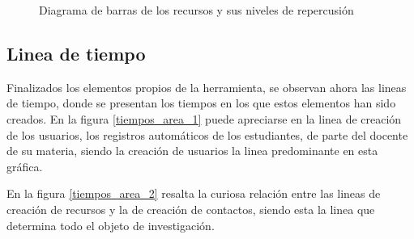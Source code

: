 \begin{figure}
\centering

\caption{Diagrama de barras de los recursos y sus niveles de repercusión}
\label{recursos_bars_1}
\end{figure}

%

\subsection{Linea de tiempo}
Finalizados los elementos propios de la herramienta, se observan ahora las
lineas de tiempo, donde se presentan los tiempos en los que estos elementos han
sido creados.
En la figura \ref{tiempos_area_1} puede apreciarse en la linea de creación de
los usuarios, los registros automáticos de los estudiantes, de parte del
docente de su materia, siendo la creación de usuarios la linea predominante en
esta gráfica.

%

En la figura \ref{tiempos_area_2} resalta la curiosa relación entre las lineas
de creación de recursos y la de creación de contactos, siendo esta la linea que
determina todo el objeto de investigación.

%


